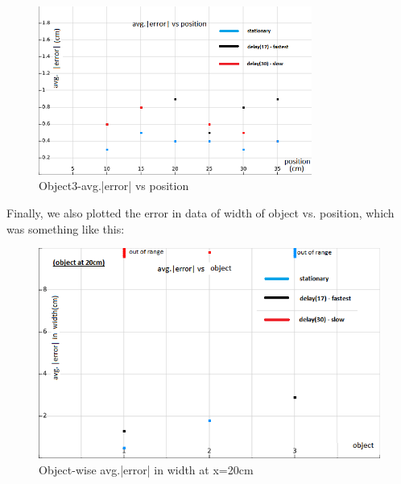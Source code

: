 \begin{figure}[H]
	\vfill
	\centering
	\includegraphics[width=0.8\textwidth]{../Files/save32}
	\caption{Object3-avg.|error| vs position}  
\end{figure}
\clearpage
Finally, we also plotted the error in data of width of object vs. position, which was something like this:
\begin{figure}[H]
	\vfill
	\centering
	\includegraphics[width=\textwidth]{../Files/savew1}
	\caption{Object-wise avg.|error| in width at x=20cm} 
\end{figure}
\clearpage